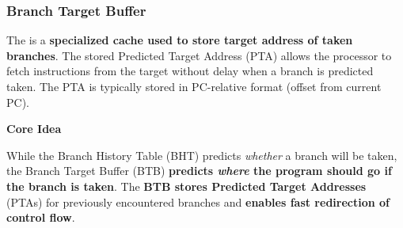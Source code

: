 \subsubsection{Branch Target Buffer}

The  is a \textbf{specialized cache used to store target address of taken branches}. The stored Predicted Target Address (PTA) allows the processor to fetch instructions from the target without delay when a branch is predicted taken. The PTA is typically stored in PC-relative format (offset from current PC).

\highspace
\begin{flushleft}
    \textcolor{Green3}{ \textbf{Core Idea}}
\end{flushleft}
While the Branch History Table (BHT) predicts \emph{whether} a branch will be taken, the Branch Target Buffer (BTB) \textbf{predicts \emph{where} the program should go if the branch is taken}. The \textbf{BTB stores Predicted Target Addresses} (PTAs) for previously encountered branches and \textbf{enables fast redirection of control flow}.

